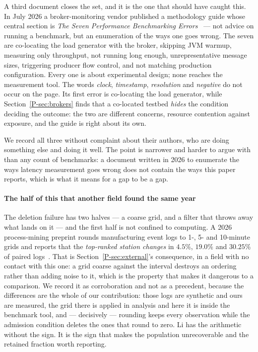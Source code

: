 \documentclass[10pt,journal,onecolumn]{IEEEtran}
\newcommand{\mainModeB}{\ref{P-sec:external}}              %
\newcommand{\mainBrokers}{\ref{P-sec:brokers}}        %
\begin{document}
A third document closes the set, and it is the one that should have caught this. In July 2026 a
broker-monitoring vendor published a methodology guide whose central section is
\emph{The Seven Performance Benchmarking Errors}~\cite{meshiq2026activemq} --- not advice on
running a benchmark, but an enumeration of the ways one goes wrong. The seven are co-locating
the load generator with the broker, skipping JVM warmup, measuring only throughput, not running
long enough, unrepresentative message sizes, triggering producer flow control, and not matching
production configuration. Every one is about experimental design; none reaches the measurement tool.
The words \emph{clock}, \emph{timestamp}, \emph{resolution} and \emph{negative} do not occur on
the page. Its first error is co-locating the load generator, while
Section~\mainBrokers{} finds that a co-located testbed \emph{hides} the condition deciding the
outcome: the two are different concerns, resource contention against exposure, and the guide is
right about its own.

We record all three without complaint about their authors, who are doing something else and
doing it well. The point is narrower and harder to argue with than any count of benchmarks: a document
written in 2026 to enumerate the ways latency measurement goes wrong does not contain the
ways this paper reports, which is what it means for a gap to be a gap.

\paragraph{The half of this that another field found the same year}
The deletion failure has two halves --- a coarse grid, and a filter that throws away what
lands on it --- and the first half is not confined to computing. A 2026 process-mining
preprint rounds manufacturing event logs to 1-, 5- and 10-minute grids and reports that the
\emph{top-ranked station changes} in $4.5\%$, $19.0\%$ and $30.25\%$ of paired
logs~\cite{li2026rounding}. That is Section~\mainModeB{}'s consequence, in a field with no
contact with this one: a grid coarse against the interval destroys an ordering rather than
adding noise to it, which is the property that makes it dangerous to a comparison. We record
it as corroboration and not as a precedent, because the differences are the whole of our
contribution: those logs are synthetic and ours are measured, the grid there is applied in
analysis and here it is inside the benchmark tool, and --- decisively --- rounding keeps every
observation while the admission condition deletes the ones that round to zero. Li has the
arithmetic without the sign. It is the sign that makes the population unrecoverable and the
retained fraction worth reporting.
\end{document}
